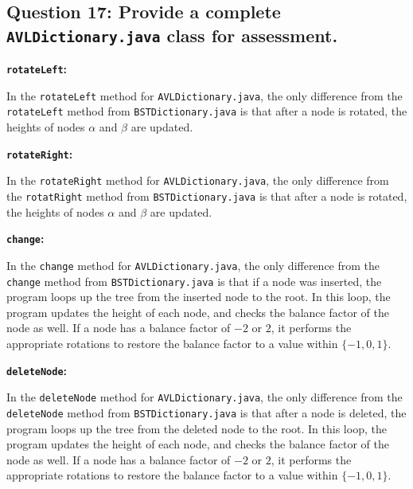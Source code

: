 \documentclass[a4paper, 12pt, titlepage]{article}
\def\code#1{\texttt{#1}}
\begin{document}
\subsection*{Question 17: Provide a complete \code{AVLDictionary.java} class for assessment.} 

\noindent
\textbf{\code{rotateLeft}:}

In the \code{rotateLeft} method for \code{AVLDictionary.java},
the only difference from the \code{rotateLeft} method from \code{BSTDictionary.java} is that after a node is rotated,
the heights of nodes $\alpha$ and $\beta$ are updated.

\noindent
\textbf{\code{rotateRight}:}

In the \code{rotateRight} method for \code{AVLDictionary.java},
the only difference from the \code{rotatRight} method from \code{BSTDictionary.java} is that after a node is rotated,
the heights of nodes $\alpha$ and $\beta$ are updated.

\noindent
\textbf{\code{change}:}

In the \code{change} method for \code{AVLDictionary.java},
the only difference from the \code{change} method from \code{BSTDictionary.java} is that if a node was inserted,
the program loops up the tree from the inserted node to the root.
In this loop,
the program updates the height of each node,
and checks the balance factor of the node as well.
If a node has a balance factor of $-2$ or $2$,
it performs the appropriate rotations to restore the balance factor to a value within $\{-1, 0, 1\}$.

\noindent
\textbf{\code{deleteNode}:}

In the \code{deleteNode} method for \code{AVLDictionary.java},
the only difference from the \code{deleteNode} method from \code{BSTDictionary.java} is that after a node is deleted,
the program loops up the tree from the deleted node to the root.
In this loop,
the program updates the height of each node,
and checks the balance factor of the node as well.
If a node has a balance factor of $-2$ or $2$,
it performs the appropriate rotations to restore the balance factor to a value within $\{-1, 0, 1\}$.
\end{document}
